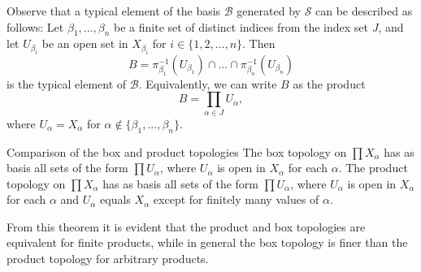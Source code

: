 \documentclass[12pt, a4paper, twoside, openright, titlepage]{book}
\begin{document}
Observe that a typical element of the basis $\mathcal{B}$ generated by $\mathcal{S}$ can be described as follows: Let $\beta_1,...,\beta_n$ be a finite set of distinct indices from the index set $J$, and let $U_{\beta_i}$ be an open set in $X_{\beta_i}$ for $i \in \{1,2,...,n\}$. Then \begin{equation*}
    B = \pi_{\beta_1}^{-1}(U_{\beta_1})\cap...\cap\pi_{\beta_n}^{-1}(U_{\beta_n})
\end{equation*}
is the typical element of $\mathcal{B}$. Equivalently, we can write $B$ as the product \begin{equation*}
    B = \prod\limits_{\alpha \in J}U_{\alpha},
\end{equation*}
where $U_{\alpha} = X_{\alpha}$ for $\alpha \notin \{\beta_1,...,\beta_n\}$.


\begin{thm}{Comparison of the box and product topologies}{}
    The box topology on $\prod X_{\alpha}$ has as basis all sets of the form $\prod U_{\alpha}$, where $U_{\alpha}$ is open in $X_{\alpha}$ for each $\alpha$. The product topology on $\prod X_{\alpha}$ has as basis all sets of the form $\prod U_{\alpha}$, where $U_{\alpha}$ is open in $X_{\alpha}$ for each $\alpha$ and $U_{\alpha}$ equals $X_{\alpha}$ except for finitely many values of $\alpha$.
\end{thm}

From this theorem it is evident that the product and box topologies are equivalent for finite products, while in general the box topology is finer than the product topology for arbitrary products.
\end{document}
